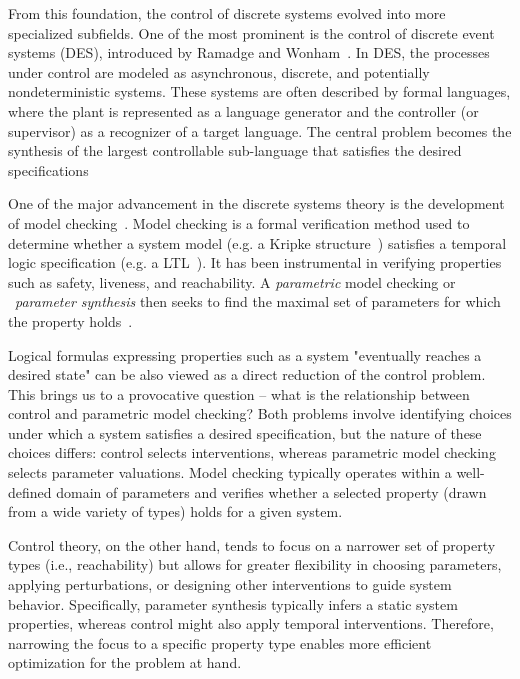 From this foundation, the control of discrete systems evolved into more specialized subfields. One of the most prominent is the control of discrete event systems (DES), introduced by Ramadge and Wonham~\cite{Ramadge1987}. In DES, the processes under control are modeled as asynchronous, discrete, and potentially nondeterministic systems. These systems are often described by formal languages, where the plant is represented as a language generator and the controller (or supervisor) as a recognizer of a target language. The central problem becomes the synthesis of the largest controllable sub-language that satisfies the desired specifications

One of the major advancement in the discrete systems theory is the development of model checking~\cite{Clarke1981,Clarke1997}. Model checking is a formal verification method used to determine whether a system model (e.g. a Kripke structure~\cite{Kripke1959,Kripke1963}) satisfies a temporal logic specification (e.g. a LTL~\cite{Pnueli1977}). It has been instrumental in verifying properties such as safety, liveness, and reachability. A \emph{parametric} model checking or ~\emph{parameter synthesis} then seeks to find the maximal set of parameters for which the property holds~\cite{Hune2002,Daws2004,Smijakova2020}.

Logical formulas expressing properties such as a system "eventually reaches a desired state" can be also viewed as a direct reduction of the control problem. This brings us to a provocative question -- what is the relationship between control and parametric model checking? Both problems involve identifying choices under which a system satisfies a desired specification, but the nature of these choices differs: control selects interventions, whereas parametric model checking selects parameter valuations. Model checking typically operates within a well-defined domain of parameters and verifies whether a selected property (drawn from a wide variety of types) holds for a given system. 

Control theory, on the other hand, tends to focus on a narrower set of property types (i.e., reachability) but allows for greater flexibility in choosing parameters, applying perturbations, or designing other interventions to guide system behavior. Specifically, parameter synthesis typically infers a static system properties, whereas control might also apply temporal interventions. Therefore, narrowing the focus to a specific property type enables more efficient optimization for the problem at hand.


